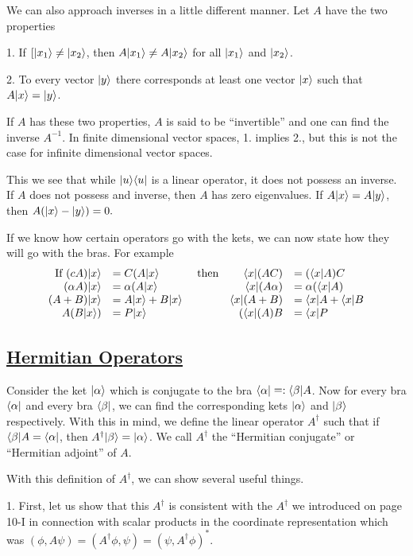We can also approach inverses in a little different manner. Let $A$ have the two properties 

1. If $[|x_1\rangle \ne |x_2\rangle$, then $A|x_1\rangle \ne A|x_2\rangle$ for all $|x_1\rangle$ and $|x_2\rangle$.

2. To every vector $|y\rangle$ there corresponds at least one vector $|x\rangle$ such that $A|x\rangle = |y\rangle$.

If $A$ has these two properties, $A$ is said to be ``invertible'' and one can find the inverse $A^{-1}$. In finite dimensional vector spaces, 1. implies 2., but
this is not the case for infinite dimensional vector spaces. 

This we see that while $|u\rangle\langle u|$ is a linear operator, it does not possess an inverse. If $A$ does not possess and inverse, then $A$ has zero eigenvalues. If 
$A|x\rangle = A|y\rangle$, then $A(|x\rangle - |y\rangle) = 0.$

If we know how certain operators go with the kets, we can now state how they will go with the bras. For example 
\[ \begin{array}{rlcrl}
\mbox{If } (cA)\ket{x} &= C(A\ket{x}      &\mbox{ then} &\bra{x}(AC) &= (\bra{x}A)C \\
   (\alpha A)\ket{x} &= \alpha(A\ket{x}   &\null               & \bra{x}(A\alpha) &= \alpha (\bra{x}A) \\
   (A + B )\ket{x} &= A\ket{x} + B\ket{x}  &\null              & \bra{x}(A +B) &= \bra{x}A + \bra{x} B \\
   A(B\ket{x}) &= P\ket{x}                        &\null             & (\bra{x}(A)B  &= \bra{x}P
\end{array}\]

\subsection{\underline{Hermitian Operators}}
Consider the ket $|\alpha\rangle$ which is conjugate to the bra $\langle \alpha| \mathrel{\mathop=}: \langle \beta|A$. Now for every bra $\langle \alpha|$ and every bra $\langle \beta|$, we can find
the corresponding kets $|\alpha\rangle$ and $|\beta\rangle$ respectively. With this in mind, we define the linear operator $A^\dagger$ such that if $\langle \beta|A = \langle \alpha|$, 
then $A^\dagger|\beta\rangle = |\alpha\rangle$. We call $A^\dagger$ the ``Hermitian conjugate'' or ``Hermitian adjoint'' of $A$.

With this definition of $A^\dagger$, we can show several useful things.

1. First, let us show that this $A^\dagger$ is consistent with the $A^\dagger$ we introduced on page 10-I in connection with scalar products in the coordinate representation which was 
$(\phi,A\psi) = (A^\dagger\phi, \psi) = (\psi,A^\dagger\phi)^*$. 

